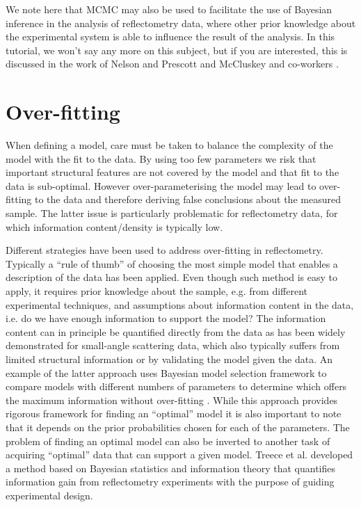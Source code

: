 \documentclass[
 reprint,
 superscriptaddress,
 amsmath,amssymb,
 aps,
]{revtex4-1}
\begin{document}
We note here that MCMC may also be used to facilitate the use of Bayesian inference in the analysis of reflectometry data, where other prior knowledge about the experimental system is able to influence the result of the analysis.
In this tutorial, we won't say any more on this subject, but if you are interested, this is discussed in the work of Nelson and Prescott \cite{nelson_refnx_2019} and McCluskey and co-workers \cite{mccluskey_general_2020}.

\section{Over-fitting}

When defining a model, care must be taken to balance the complexity of the model with the fit to the data.
By using too few parameters we risk that important structural features are not covered by the model and that fit to the data is sub-optimal.
However over-parameterising the model may lead to over-fitting to the data and therefore deriving false conclusions about the measured sample.
The latter issue is particularly problematic for reflectometry data, for which information content/density is typically low.

Different strategies have been used to address over-fitting in reflectometry.
Typically a ``rule of thumb'' of choosing the most simple model that enables a description of the data has been applied.
Even though such method is easy to apply, it requires prior knowledge about the sample, e.g. from different experimental techniques, and assumptions about information content in the data, i.e. do we have enough information to support the model?
The information content can in principle be quantified directly from the data as has been widely demonstrated for small-angle scattering data, which also typically suffers from limited structural information \cite{Larsen_2018} or by validating the model given the data. %
An example of the latter approach uses Bayesian model selection framework to compare models with different numbers of parameters to determine which offers the maximum information without over-fitting \cite{hughes_model_selection_2019, mccluskey_general_2020}.
While this approach provides rigorous framework for finding an ``optimal'' model it is also important to note that it depends on the prior probabilities chosen for each of the parameters.
The problem of finding an optimal model can also be inverted to another task of acquiring ``optimal'' data that can support a given model.
Treece et al. \cite{Treece_2019} developed a method based on Bayesian statistics and information theory that quantifies information gain from reflectometry experiments with the purpose of guiding experimental design.
\end{document}

